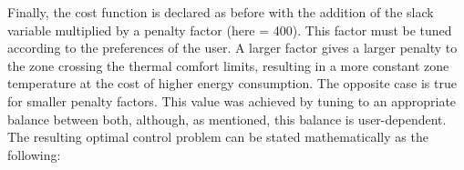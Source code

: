 
Finally, the cost function is declared as before with the addition of the slack variable multiplied by a penalty factor (here = 400). This factor must be tuned according to the preferences of the user. A larger factor gives a larger penalty to the zone crossing the thermal comfort limits, resulting in a more constant zone temperature at the cost of higher energy consumption. The opposite case is true for smaller penalty factors. This value was achieved by tuning to an appropriate balance between both, although, as mentioned, this balance is user-dependent.\\

The resulting optimal control problem can be stated mathematically as the following:

